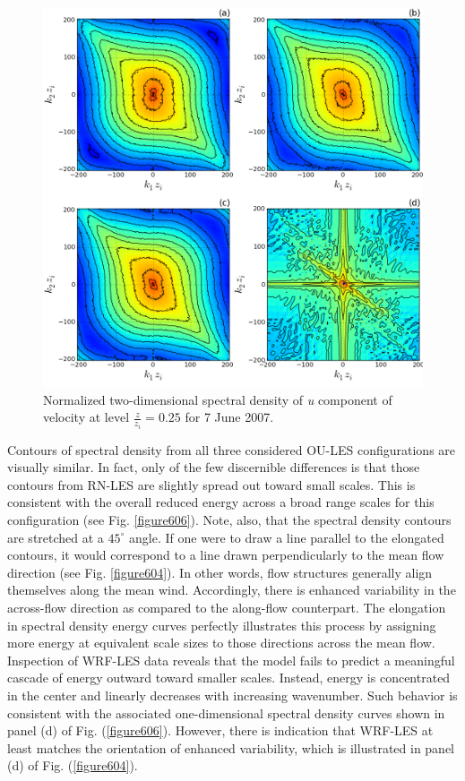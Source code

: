 \begin{figure}[H]
\begin{center}
\includegraphics[width=\textwidth]{figures/chapter6/spectra2D_u_20070607}
\end{center}
\caption{Normalized two-dimensional spectral density of \textit{u} component of velocity at level $\frac{z}{z_i}=0.25$ for 7 June 2007.}
\label{figure608}
\end{figure}


Contours of spectral density from all three considered OU-LES configurations are visually similar. In fact, only of the few discernible differences is that those contours from RN-LES are slightly spread out toward small scales. This is consistent with the overall reduced energy across a broad range scales for this configuration (see Fig. \autoref{figure606}). Note, also, that the spectral density contours are stretched at a $45^\circ$ angle. If one were to draw a line parallel to the elongated contours, it would correspond to a line drawn perpendicularly to the mean flow direction (see Fig. \autoref{figure604}). In other words, flow structures generally align themselves along the mean wind. Accordingly, there is enhanced variability in the across-flow direction as compared to the along-flow counterpart. The elongation in spectral density energy curves perfectly illustrates this process by assigning more energy at equivalent scale sizes to those directions across the mean flow. Inspection of WRF-LES data reveals that the model fails to predict a meaningful cascade of energy outward toward smaller scales. Instead, energy is concentrated in the center and linearly decreases with increasing wavenumber. Such behavior is consistent with the associated one-dimensional spectral density curves shown in panel (d) of Fig. (\autoref{figure606}). However, there is indication that WRF-LES at least matches the orientation of enhanced variability, which is illustrated in panel (d) of Fig. (\autoref{figure604}).

